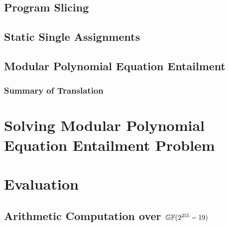 \documentclass{llncs}
\begin{document}
\vspace{-.5em}
\subsection{Program Slicing}
\vspace{-.5em}
\label{subsection:translation:slicing}



\vspace{-.5em}
\subsection{Static Single Assignments}
\vspace{-.5em}
\label{subsection:translation:static-single-assignment}



\vspace{-.5em}
\subsection{Modular Polynomial Equation Entailment}
\vspace{-.5em}
\label{subsection:translation:multivariant-polynomial-equations}


\vspace{-.5em}
\subsubsection*{Summary of Translation}
\vspace{-.5em}



\vspace{-.5em}
\section{Solving Modular Polynomial Equation Entailment Problem}
\vspace{-.5em}
\label{section:solving-algebraic-equations}


\vspace{-.5em}
\section{Evaluation}
\vspace{-.5em}
\label{section:evaluation}


\vspace{-.5em}
\subsection{Arithmetic Computation over $\mathbb{GF}(2^{255}-19)$}
\vspace{-.5em}
\label{subection:evaluation:multiplication}

\end{document}

